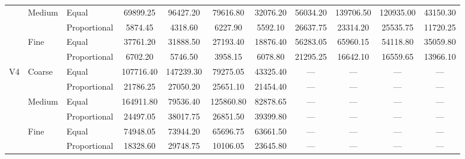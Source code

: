 \documentclass[10pt,journal,cspaper,compsoc,onecolumn]{IEEEtran}
\begin{document}
\begin{table}
\begin{tabular}{|c|l|l|c|c|c|c|c|c|c|c|}
	& Medium	& Equal	& 69899.25	& 96427.20	& 79616.80	& 32076.20	& 56034.20	& 139706.50	& 120935.00	& 43150.30	 \\ \cline{3-11}
	& 	& Proportional	& 5874.45	& 4318.60	& 6227.90	& 5592.10	& 26637.75	& 23314.20	& 25535.75	& 11720.25	 \\ \cline{2-11}
	& Fine	& Equal	& 37761.20	& 31888.50	& 27193.40	& 18876.40	& 56283.05	& 65960.15	& 54118.80	& 35059.80	 \\ \cline{3-11}
	& 	& Proportional	& 6702.20	& 5746.50	& 3958.15	& 6078.80	& 21295.25	& 16642.10	& 16559.65	& 13966.10	 \\ \hline
V4	& Coarse	& Equal	& 107716.40	& 147239.30	& 79275.05	& 43325.40	& ---	& ---	& ---	& ---	 \\ \cline{3-11}
	& 	& Proportional	& 21786.25	& 27050.20	& 25651.10	& 21454.40	& ---	& ---	& ---	& ---	 \\ \cline{2-11}
	& Medium	& Equal	& 164911.80	& 79536.40	& 125860.80	& 82878.65	& ---	& ---	& ---	& ---	 \\ \cline{3-11}
	& 	& Proportional	& 24497.05	& 38017.75	& 26851.50	& 39399.80	& ---	& ---	& ---	& ---	 \\ \cline{2-11}
	& Fine	& Equal	& 74948.05	& 73944.20	& 65696.75	& 63661.50	& ---	& ---	& ---	& ---	 \\ \cline{3-11}
	& 	& Proportional	& 18328.60	& 29748.75	& 10106.05	& 23645.80	& ---	& ---	& ---	& ---	 \\ \hline
\end{tabular}
\end{table}
\end{document}
